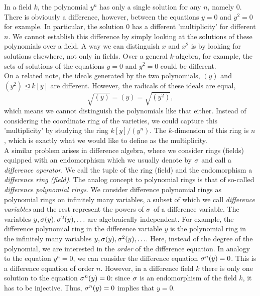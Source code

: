 In a field $k$, the polynomial $y^n$ has only a single solution for any $n$, namely $0$. 
There is obviously a difference, however, between the equations $y = 0$ and $y^2 = 0$ for example. In particular, the solution $0$ has a different 'multiplicity' for different $n$.
We cannot establish this difference by simply looking at the solutions of these polynomials over a field.
  A way we can distinguish $x$ and $x^2$ is by looking for solutions elsewhere, not only in fields.
Over a general $k$-algebra, for example, the sets of solutions of the equations $y = 0$ and $y^2 = 0$ could be different. \\


On a related note, the ideals generated by the two polynomials, $(y)$ and $(y^2) \unlhd k[y]$ are different. However, the radicals of these ideals are equal,
$$ \sqrt{ (y) } = (y) = \sqrt{(y^2)}, $$ which means we cannot distinguish the polynomials like that either.
Instead of considering the coordinate ring of the varieties, we could capture this 'multiplicity' by studying the ring $k[y]/(y^n)$.
The $k$-dimension of this ring is $n$, which is exactly what we would like to define as the multiplicity. \\

A similar problem arises in difference algebra, where we consider rings (fields) equipped with an endomorphism which we usually denote by $\sigma$ and call a \emph{difference operator}. We call the tuple of the ring (field) and the endomorphism a \emph{difference ring (field)}.
The analog concept to polynomial rings is that of so-called \emph{difference polynomial rings}. We consider difference polynomial rings as polynomial rings on infinitely many variables, a subset of which we call \emph{difference variables} and the rest represent the powers of $\sigma$ of a difference variable. The variables $y, \sigma(y), \sigma^2(y), \ldots$ are algebraically independent.
For example, the difference polynomial ring in the difference variable $y$ is the polynomial ring in the infinitely many variables $y, \sigma(y), \sigma^2(y),\ldots$.
Here, instead of the degree of the polynomial, we are interested in the \emph{order} of the difference equation.
In analogy to the equation $y^n = 0$, we can consider the difference equation $\sigma^n(y) = 0$. This is a difference equation of order $n$.
However, in a difference field $k$ there is only one solution to the equation $\sigma^n(y) = 0$: since $\sigma$ is an endomorphism of the field $k$,
it has to be injective. Thus, $\sigma^n(y) = 0$ implies that $y = 0$. \\


